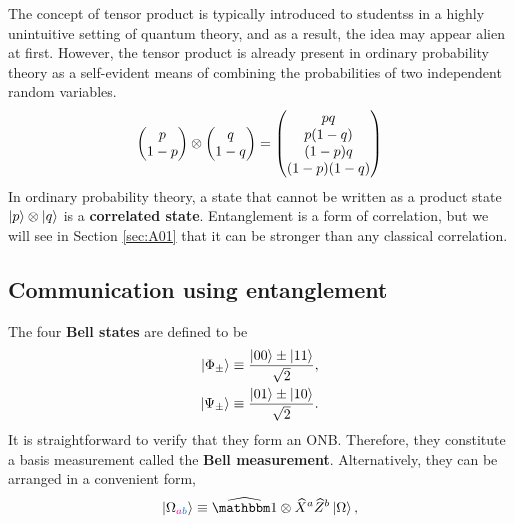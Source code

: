 \begin{mybox}
The concept of tensor product is typically introduced to studentss in a highly unintuitive setting of quantum theory, and as a result, the idea may appear alien at first. However, the tensor product is already present in ordinary probability theory as a self-evident means of combining the probabilities of two independent random variables.
\begin{align}
	\mqty(p \\ 1-p) \otimes \mqty(q\\1-q) = \mqty(pq \\ p(1-q) \\ (1-p)q \\ (1-p)(1-q))
\end{align}
In ordinary probability theory, a state that cannot be written as a product state $\ket{p}\otimes\ket{q}$ is a {\bf correlated state}. Entanglement is a form of correlation, but we will see in Section \ref{sec:A01} that it can be stronger than any classical correlation.
\end{mybox}

\subsection{Communication using entanglement}

The four {\bf Bell states} are defined to be
\begin{align}
	\ket{\Phi_{\pm}} &\equiv \frac{\ket{00}\pm\ket{11}}{\sqrt{2}}, \\
	\ket{\Psi_{\pm}} &\equiv 
	\frac{\ket{01}\pm\ket{10}}{\sqrt{2}}.
\end{align}
It is straightforward to verify that they form an ONB. Therefore, they constitute a basis measurement called the {\bf Bell measurement}.
Alternatively, they can be arranged in a convenient form, 
\begin{align}\label{eq:steering}
	\ket{\Omega_{{\color{magenta}\tikzmark{a}a}{\color{eqcolor}\tikzmark{b}b}}} \equiv \op\id\otimes \op X^a\op Z^b \ket{\Omega},
\end{align}





